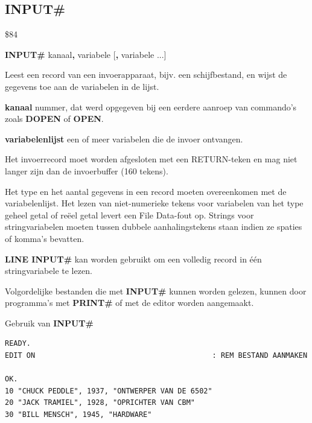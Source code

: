\subsection{INPUT\#}
\begin{description}[leftmargin=2cm,style=nextline]
\item [Token:]    \$84

\item [Formaat:]   {\bf INPUT\#} kanaal{\bf,} variabele [{\bf,} variabele ...]

\item [Gebruik:]    Leest een record van een invoerapparaat, bijv. een schijfbestand, en wijst de gegevens toe aan de variabelen in de lijst.

                  {\bf kanaal} nummer, dat werd opgegeven bij een eerdere aanroep van commando's zoals {\bf DOPEN} of {\bf OPEN}.

                  {\bf variabelenlijst} een of meer variabelen die de invoer ontvangen.

                  Het invoerrecord moet worden afgesloten met een RETURN-teken en mag niet langer zijn dan de invoerbuffer (160 tekens).

\item [Opmerkingen:]  Het type en het aantal gegevens in een record moeten overeenkomen met de variabelenlijst. Het lezen van niet-numerieke tekens voor variabelen van het type geheel getal of reëel getal levert een File Data-fout op. Strings voor stringvariabelen moeten tussen dubbele aanhalingstekens staan indien ze spaties of komma's bevatten.

                  {\bf LINE INPUT\#} kan worden gebruikt om een volledig record in één stringvariabele te lezen.

                  Volgordelijke bestanden die met {\bf INPUT\#} kunnen worden gelezen, kunnen door programma's met {\bf PRINT\#} of met de editor worden aangemaakt.

\item [Voorbeeld:]  Gebruik van {\bf INPUT\#}

\begin{tcolorbox}[colback=black,coltext=white]
\verbatimfont{\codefont}
\begin{verbatim}
READY.
EDIT ON                                         : REM BESTAND AANMAKEN

OK.
10 "CHUCK PEDDLE", 1937, "ONTWERPER VAN DE 6502"
20 "JACK TRAMIEL", 1928, "OPRICHTER VAN CBM"
30 "BILL MENSCH", 1945, "HARDWARE"


\end{verbatim}
\end{tcolorbox}
\end{description}
